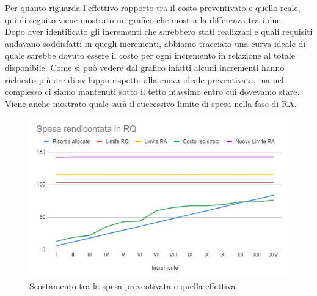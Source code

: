 \documentclass[../piano_di_progetto.tex]{subfiles}
\begin{document}
Per quanto riguarda l'effettivo rapporto tra il costo preventivato e quello reale, qui di seguito viene mostrato un grafico che mostra la differenza tra i due.\\
Dopo aver identificato gli incrementi che sarebbero stati realizzati e quali requisiti andavano soddisfatti in quegli incrementi, abbiamo tracciato una curva ideale di quale sarebbe 
dovuto essere il costo per ogni incremento in relazione al totale disponibile. Come si può vedere dal grafico infatti alcuni incrementi hanno richiesto più ore di sviluppo
rispetto alla curva ideale preventivata, ma nel complesso ci siamo mantenuti sotto il tetto massimo entro cui dovevamo stare. Viene anche mostrato quale sarà il successivo limite di spesa nella fase di RA.


\begin{figure}[H]
	\centering
	\includegraphics[width=17cm]{src/img/report/spesa_RQ.JPG}
	\caption{Scostamento tra la spesa preventivata e quella effettiva}
\end{figure}







\end{document}
